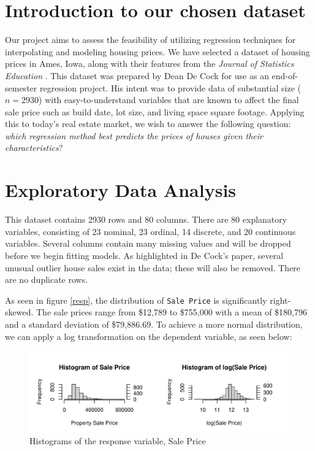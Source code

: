 \documentclass[aoas]{imsart}
\numberwithin{equation}{section}
\theoremstyle{plain}
\theoremstyle{remark}
\begin{document}
\newenvironment{kframe}{}{}

\hypertarget{introduction-to-our-chosen-dataset}{%
\section{Introduction to our chosen
dataset}\label{introduction-to-our-chosen-dataset}}

Our project aims to assess the feasibility of utilizing regression
techniques for interpolating and modeling housing prices. We have
selected a dataset of housing prices in Ames, Iowa, along with their
features from the \emph{Journal of Statistics Education}
\citep{cock2011amesdataset}. This dataset was prepared by Dean De Cock
for use as an end-of-semester regression project. His intent was to
provide data of substantial size (\(n=2930\)) with easy-to-understand
variables that are known to affect the final sale price such as build
date, lot size, and living space square footage. Applying this to
today's real estate market, we wish to answer the following question:
\emph{which regression method best predicts the prices of houses given
their characteristics}?

\hypertarget{exploratory-data-analysis}{%
\section{Exploratory Data Analysis}\label{exploratory-data-analysis}}

This dataset contains 2930 rows and 80 columns. There are 80 explanatory
variables, consisting of 23 nominal, 23 ordinal, 14 discrete, and 20
continuous variables. Several columns contain many missing values and
will be dropped before we begin fitting models. As highlighted in De
Cock's paper, several unusual outlier house sales exist in the data;
these will also be removed. There are no duplicate rows.

As seen in figure \ref{resp}, the distribution of \texttt{Sale\ Price}
is significantly right-skewed. The sale prices range from \$12,789 to
\$755,000 with a mean of \$180,796 and a standard deviation of
\$79,886.69. To achieve a more normal distribution, we can apply a log
transformation on the dependent variable, as seen below:

\begin{figure}
\includegraphics[trim={0 1cm 0 1cm},clip]{STAT-444-FINAL-PROJECT-PAPER_files/figure-latex/unnamed-chunk-3-1} \caption{Histograms of the response variable, Sale Price\label{resp}}\label{fig:unnamed-chunk-3}
\end{figure}
\end{document}
